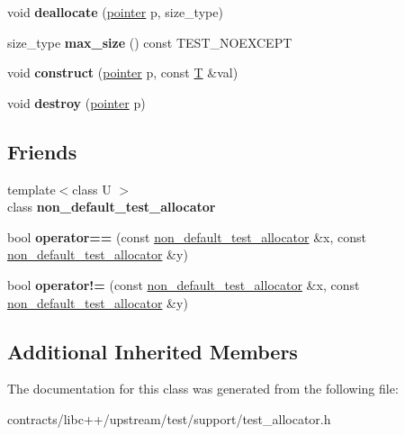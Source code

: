 \begin{DoxyCompactItemize}
void {\bfseries deallocate} (\mbox{\hyperlink{struct_t}{pointer}} p, size\+\_\+type)
\item 
\mbox{\label{classnon__default__test__allocator_ac62d868b9dfae2b5d098e2700b345103}} 
size\+\_\+type {\bfseries max\+\_\+size} () const T\+E\+S\+T\+\_\+\+N\+O\+E\+X\+C\+E\+PT
\item 
\mbox{\label{classnon__default__test__allocator_a4f99c0391c4536dff235e5e267f15082}} 
void {\bfseries construct} (\mbox{\hyperlink{struct_t}{pointer}} p, const \mbox{\hyperlink{struct_t}{T}} \&val)
\item 
\mbox{\label{classnon__default__test__allocator_a45d62d948dd51dcb93ccf9ea94fdbf3d}} 
void {\bfseries destroy} (\mbox{\hyperlink{struct_t}{pointer}} p)
\end{DoxyCompactItemize}
\subsection*{Friends}
\begin{DoxyCompactItemize}
\item 
\mbox{\label{classnon__default__test__allocator_a3febf1ff8757e8ae9c6929d0e74d6e21}} 
{\footnotesize template$<$class U $>$ }\\class {\bfseries non\+\_\+default\+\_\+test\+\_\+allocator}
\item 
\mbox{\label{classnon__default__test__allocator_a11ee9b0147ee7ed2ab078700d206d78d}} 
bool {\bfseries operator==} (const \mbox{\hyperlink{classnon__default__test__allocator}{non\+\_\+default\+\_\+test\+\_\+allocator}} \&x, const \mbox{\hyperlink{classnon__default__test__allocator}{non\+\_\+default\+\_\+test\+\_\+allocator}} \&y)
\item 
\mbox{\label{classnon__default__test__allocator_a11ca0d6e6888835b60b8b988ccc170d5}} 
bool {\bfseries operator!=} (const \mbox{\hyperlink{classnon__default__test__allocator}{non\+\_\+default\+\_\+test\+\_\+allocator}} \&x, const \mbox{\hyperlink{classnon__default__test__allocator}{non\+\_\+default\+\_\+test\+\_\+allocator}} \&y)
\end{DoxyCompactItemize}
\subsection*{Additional Inherited Members}


The documentation for this class was generated from the following file\+:\begin{DoxyCompactItemize}
\item 
contracts/libc++/upstream/test/support/test\+\_\+allocator.\+h\end{DoxyCompactItemize}
